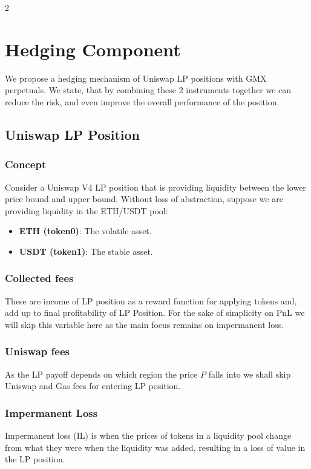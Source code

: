 \documentclass[12pt]{article}
\begin{document}
\medskip
\begin{multicols}{2}

\section{Hedging Component}
\label{sec:hedging}

We propose a hedging mechanism of Uniswap LP positions with GMX perpetuals. We state, that by combining these 2 instruments together we can reduce the risk, and even improve the overall performance of the position. 

\subsection{Uniswap LP Position}
\label{sec:uniswaplp}

\subsubsection{Concept}
Consider a Uniswap V4 LP position that is providing liquidity between the lower price bound and upper bound. Without loss of abstraction, suppose we are providing liquidity in the ETH/USDT pool:

\begin{itemize}
	\item \textbf{ETH (token0)}: The volatile asset.
	\item \textbf{USDT (token1)}: The stable asset.
\end{itemize}

\subsubsection{Collected fees}
These are income of LP position as a reward function for applying tokens and, add up to final profitability of LP Position. For the sake of simplicity on PnL we will skip this variable here as the main focus remains on impermanent loss.

\subsubsection{Uniswap fees}
As the LP payoff depends on which region the price $P$ falls into we shall skip Uniswap and Gas fees for entering LP position.

\subsubsection{Impermanent Loss}
Impermanent loss (IL) is when the prices of tokens in a liquidity pool change from what they were when the liquidity was added, resulting in a loss of value in the LP position.

\end{multicols}
\end{document}
